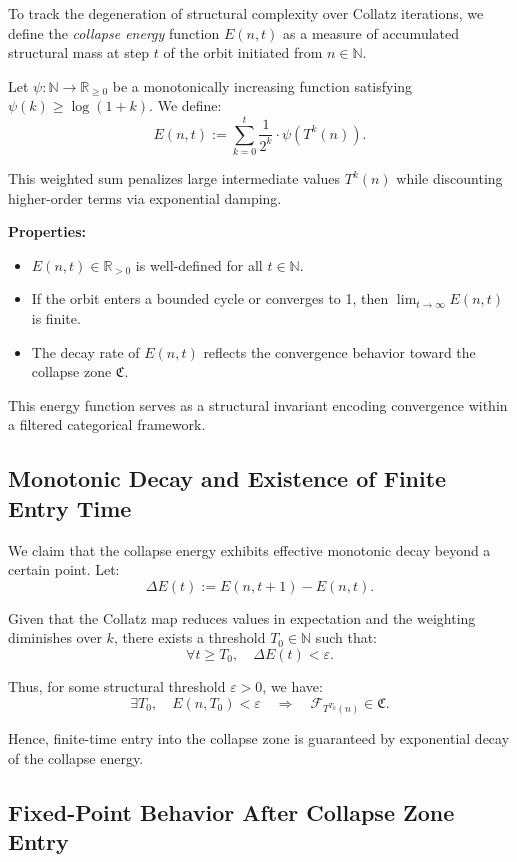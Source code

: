 \documentclass[11pt]{article}
\begin{document}
To track the degeneration of structural complexity over Collatz iterations, we define the \emph{collapse energy} function \( E(n, t) \) as a measure of accumulated structural mass at step \( t \) of the orbit initiated from \( n \in \mathbb{N} \).

Let \( \psi : \mathbb{N} \to \mathbb{R}_{\geq 0} \) be a monotonically increasing function satisfying \( \psi(k) \geq \log(1+k) \). We define:
\[
E(n, t) := \sum_{k=0}^{t} \frac{1}{2^k} \cdot \psi(T^k(n)).
\]

This weighted sum penalizes large intermediate values \( T^k(n) \) while discounting higher-order terms via exponential damping.

\textbf{Properties:}
\begin{itemize}
  \item \( E(n,t) \in \mathbb{R}_{> 0} \) is well-defined for all \( t \in \mathbb{N} \).
  \item If the orbit enters a bounded cycle or converges to 1, then \( \lim_{t \to \infty} E(n,t) \) is finite.
  \item The decay rate of \( E(n,t) \) reflects the convergence behavior toward the collapse zone \( \mathfrak{C} \).
\end{itemize}

This energy function serves as a structural invariant encoding convergence within a filtered categorical framework.

\subsection{Monotonic Decay and Existence of Finite Entry Time}

We claim that the collapse energy exhibits effective monotonic decay beyond a certain point. Let:
\[
\Delta E(t) := E(n, t+1) - E(n, t).
\]

Given that the Collatz map reduces values in expectation and the weighting diminishes over \( k \), there exists a threshold \( T_0 \in \mathbb{N} \) such that:
\[
\forall t \geq T_0,\quad \Delta E(t) < \varepsilon.
\]

Thus, for some structural threshold \( \varepsilon > 0 \), we have:
\[
\exists T_0,\quad E(n, T_0) < \varepsilon \quad \Rightarrow \quad \mathcal{F}_{T^{T_0}(n)} \in \mathfrak{C}.
\]

Hence, finite-time entry into the collapse zone is guaranteed by exponential decay of the collapse energy.

\subsection{Fixed-Point Behavior After Collapse Zone Entry}
\end{document}
